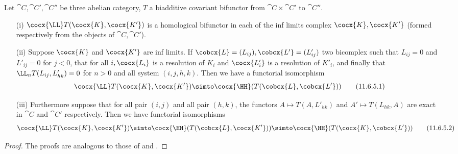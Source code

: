 \begin{proposition}[11.6.5]
Let $\cat{C}, \cat{C'}, \cat{C''}$ be three abelian category, $T$ a biadditive covariant bifunctor from $\cat{C}\times \cat{C'}$ to $\cat{C''}$.
\begin{enumerate}
  \item[(i)] $\cocx{\LL} T(\cocx{K}, \cocx{K'})$ is a homological bifunctor in each of the inf limits complex $\cocx{K}, \cocx{K'}$ (formed respectively from the objects of $\cat{C}, \cat{C'}$).
  \item[(ii)] Suppose $\cocx{K}$ and $\cocx{K'}$ are inf limits. If $\cobcx{L} = (L_{ij}), \cobcx{L'} = (L'_{ij})$ two bicomplex such that $L_{ij} = 0$ and $L'_{ij} = 0$ for $j<0$, 
  that for all $i, \cocx{L_i}$ is a resolution of $K_i$ and $\cocx{L'_i}$ is a resolution of $K'_i$, and finally that $\LL_n T(L_{ij}, L'_{hk}) = 0$ for $n>0$ and all system $(i,j,h,k)$.
  Then we have a functorial isomorphism
  \[
    \label{0.11.6.5.1}
    \cocx{\LL} T(\cocx{K}, \cocx{K'}) \simto \cocx{\HH}(T(\cobcx{L}, \cobcx{L'}))
    \tag{11.6.5.1}
  \]
  \item[(iii)] Furthermore suppose that for all pair $(i,j)$ and all pair $(h,k)$, the functors $A\mapsto T(A,L'_{hk})$ and $A'\mapsto T(L_{hk}, A)$ are exact in $\cat{C}$ and $\cat{C'}$ respectively.
  Then we have functorial isomorphisms
  \[
    \label{0.11.6.5.2}
    \cocx{\LL} T(\cocx{K}, \cocx{K'}) \simto \cocx{\HH}(T(\cobcx{L}, \cocx{K'}))\simto \cocx{\HH}(T(\cocx{K}, \cobcx{L'}))
    \tag{11.6.5.2}
  \]
\end{enumerate}
\end{proposition}
\begin{proof}
The proofs are analogous to those of  and .
\end{proof}

